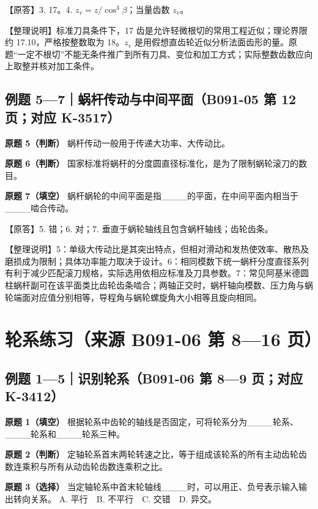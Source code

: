 \documentclass[zihao=5,a4paper,UTF8,fontset=fandol]{ctexart}
\begin{document}
【原答】3. 17。4. $z_v=z/\cos^3\beta$；当量齿数 $z_v$。


【整理说明】标准刀具条件下，17 齿是允许轻微根切的常用工程近似；理论界限约 17.10，严格按整数取为 18。$z_v$ 是用假想直齿轮近似分析法面齿形的量。原题“一定不根切”不能无条件推广到所有刀具、变位和加工方式；实际整数齿数应向上取整并核对加工条件。


\subsection{例题 5—7｜蜗杆传动与中间平面（B091-05 第 12 页；对应 K-3517）}

\textbf{原题 5（判断）} 蜗杆传动一般用于传递大功率、大传动比。


\textbf{原题 6（判断）} 国家标准将蜗杆的分度圆直径标准化，是为了限制蜗轮滚刀的数目。


\textbf{原题 7（填空）} 蜗杆蜗轮的中间平面是指\_\_\_\_的平面，在中间平面内相当于\_\_\_\_啮合传动。


【原答】5. 错；6. 对；7. 垂直于蜗轮轴线且包含蜗杆轴线；齿轮齿条。


【整理说明】5：单级大传动比是其突出特点，但相对滑动和发热使效率、散热及磨损成为限制；具体功率能力取决于设计。6：相同模数下统一蜗杆分度直径系列有利于减少匹配滚刀规格，实际选用依相应标准及刀具参数。7：常见阿基米德圆柱蜗杆副可在该平面类比齿轮齿条啮合；两轴正交时，蜗杆轴向模数、压力角与蜗轮端面对应值分别相等，导程角与蜗轮螺旋角大小相等且旋向相同。




\section{轮系练习（来源 B091-06 第 8—16 页）}

\subsection{例题 1—5｜识别轮系（B091-06 第 8—9 页；对应 K-3412）}

\textbf{原题 1（填空）} 根据轮系中齿轮的轴线是否固定，可将轮系分为\_\_\_\_轮系、\_\_\_\_轮系和\_\_\_\_轮系三种。


\textbf{原题 2（判断）} 定轴轮系首末两轮转速之比，等于组成该轮系的所有主动齿轮齿数连乘积与所有从动齿轮齿数连乘积之比。


\textbf{原题 3（选择）} 当定轴轮系中首末轮轴线\_\_\_\_时，可以用正、负号表示输入输出转向关系。
A. 平行　B. 不平行　C. 交错　D. 异交。
\end{document}
